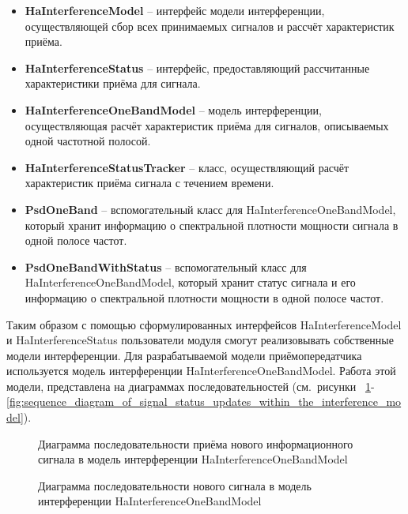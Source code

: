 \documentclass[
    numbers=section,
    document-code={ВКРБ--09.03.04--10.19--XX--26--81}
]{../latex/fqw}
\begin{document}
    \begin{itemize}
        \item \textbf{HaInterferenceModel} -- интерфейс модели интерференции,
        осуществляющей сбор всех принимаемых сигналов и рассчёт характеристик приёма.
        \item \textbf{HaInterferenceStatus} -- интерфейс, предоставляющий рассчитанные характеристики приёма для сигнала.
        \item \textbf{HaInterferenceOneBandModel} -- модель интерференции,
        осуществляющая расчёт характеристик приёма для сигналов,
        описываемых одной частотной полосой.
        \item \textbf{HaInterferenceStatusTracker} -- класс,
        осуществляющий расчёт характеристик приёма сигнала с течением времени.
        \item \textbf{PsdOneBand} -- вспомогательный класс для HaInterferenceOneBandModel,
        который хранит информацию о спектральной плотности мощности сигнала в одной полосе частот.
        \item \textbf{PsdOneBandWithStatus} -- вспомогательный класс для HaInterferenceOneBandModel,
        который хранит статус сигнала и его информацию о спектральной плотности мощности в одной полосе частот.
    \end{itemize}

    Таким образом с помощью сформулированных интерфейсов HaInterferenceModel и HaInterferenceStatus
    пользователи модуля смогут реализовывать собственные модели интерференции.
    Для разрабатываемой модели приёмопередатчика используется модель интерференции HaInterferenceOneBandModel.
    Работа этой модели, представлена на диаграммах последовательностей (см.~рисунки
    ~\ref{fig:sequence_diagram_of_signal_reception_into_the_interference_model}-
    \ref{fig:sequence_diagram_of_signal_status_updates_within_the_interference_model}).

    \begin{figure}[H]
        \centering
        \fbox{\rule{0pt}{20mm}\rule{40mm}{0pt}}
        \caption{Диаграмма последовательности приёма нового информационного сигнала
        в модель интерференции HaInterferenceOneBandModel}
        \label{fig:sequence_diagram_of_signal_reception_into_the_interference_model}
    \end{figure}

    \begin{figure}[H]
        \centering
        \fbox{\rule{0pt}{20mm}\rule{40mm}{0pt}}
        \caption{Диаграмма последовательности нового сигнала в модель интерференции HaInterferenceOneBandModel}
        \label{fig:sequence_diagram_of_information_signal_reception_into_the_interference_model}
    \end{figure}
\end{document}
